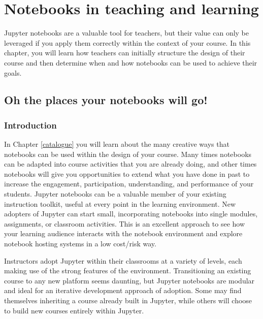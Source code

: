 \documentclass[]{book}
\begin{document}
\hypertarget{notebooks-in-teaching-and-learning}{%
\chapter{Notebooks in teaching and learning}\label{notebooks-in-teaching-and-learning}}

Jupyter notebooks are a valuable tool for teachers, but their value can only be
leveraged if you apply them correctly within the context of your course. In
this chapter, you will learn how teachers can initially structure the design of
their course and then determine when and how notebooks can be used to achieve
their goals.

\hypertarget{oh-the-places-your-notebooks-will-go}{%
\section{Oh the places your notebooks will go!}\label{oh-the-places-your-notebooks-will-go}}

\hypertarget{introduction}{%
\subsection{Introduction}\label{introduction}}

In Chapter \ref{catalogue} you will learn about the many creative ways that notebooks can be
used within the design of your course. Many times notebooks can be adapted into
course activities that you are already doing, and other times notebooks will
give you opportunities to extend what you have done in past to increase the
engagement, participation, understanding, and performance of your students.
Jupyter notebooks can be a valuable member of your existing instruction toolkit,
useful at every point in the learning environment. New adopters of Jupyter can
start small, incorporating notebooks into single modules, assignments, or
classroom activities. This is an excellent approach to see how your learning
audience interacts with the notebook environment and explore notebook hosting
systems in a low cost/risk way.

Instructors adopt Jupyter within their classrooms at a variety of levels, each
making use of the strong features of the environment. Transitioning an existing
course to any new platform seems daunting, but Jupyter notebooks are modular and
ideal for an iterative development approach of adoption. Some may find
themselves inheriting a course already built in Jupyter, while others will
choose to build new courses entirely within Jupyter.
\end{document}
